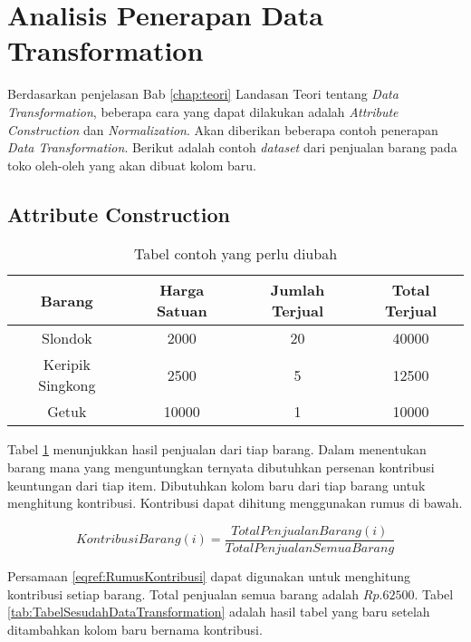 \section{Analisis Penerapan Data Transformation}
Berdasarkan penjelasan Bab \ref{chap:teori} Landasan Teori tentang \textit{Data Transformation}, beberapa  cara yang dapat dilakukan adalah \textit{Attribute Construction} dan \textit{Normalization}. Akan diberikan beberapa contoh penerapan \textit{Data Transformation}. Berikut adalah contoh \textit{dataset} dari penjualan barang pada toko oleh-oleh yang akan dibuat kolom baru.

\subsection{Attribute Construction}

\begin{table}[H]
\caption{Tabel contoh yang perlu diubah}
\centering
\begin{tabular}{|c|c|c|c|}
\hline 
\textbf{Barang} & \textbf{Harga Satuan} & \textbf{Jumlah Terjual} & \textbf{Total Terjual} \\ 
\hline 
Slondok & 2000 & 20 & 40000 \\ 
\hline 
Keripik Singkong & 2500 & 5 & 12500 \\ 
\hline 
Getuk & 10000 & 1 & 10000 \\ 
\hline 
\end{tabular} 
\label{tab:TabelSebelumDataTransformation}
\end{table}

Tabel \ref{tab:TabelSebelumDataTransformation} menunjukkan hasil penjualan dari tiap barang. Dalam menentukan barang mana yang menguntungkan ternyata dibutuhkan persenan kontribusi keuntungan dari tiap item. Dibutuhkan kolom baru dari tiap barang untuk menghitung kontribusi. Kontribusi dapat dihitung menggunakan rumus di bawah.

\begin{equation}
  Kontribusi Barang(i) = \frac{Total Penjualan Barang (i)}{Total Penjualan Semua Barang}
  \label{eqref:RumusKontribusi}
\end{equation}

Persamaan \ref{eqref:RumusKontribusi} dapat digunakan untuk menghitung kontribusi setiap barang. Total penjualan semua barang adalah $Rp.62500$. Tabel \ref{tab:TabelSesudahDataTransformation}  adalah hasil tabel yang baru setelah ditambahkan kolom baru bernama kontribusi.

